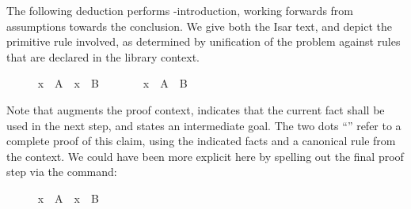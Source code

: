 \begin{isabellebody}
\begin{isamarkuptext}
  \medskip The following deduction performs \isa{{\isachardoublequote}{\isasyminter}{\isachardoublequote}}-introduction,
  working forwards from assumptions towards the conclusion.  We give
  both the Isar text, and depict the primitive rule involved, as
  determined by unification of the problem against rules that are
  declared in the library context.%
\end{isamarkuptext}%
\isamarkuptrue%
%
\medskip\begin{minipage}{0.6\textwidth}
%
\isadelimproof
\ \ \ \ %
\endisadelimproof
%
\isatagproof
{}\isamarkupfalse%
\ {\isachardoublequoteopen}x\ {\isasymin}\ A{\isachardoublequoteclose}\ \ {\isachardoublequoteopen}x\ {\isasymin}\ B{\isachardoublequoteclose}\isanewline
\ \ \ \ \isamarkupfalse%
\ \isamarkupfalse%
\ {\isachardoublequoteopen}x\ {\isasymin}\ A\ {\isasyminter}\ B{\isachardoublequoteclose}\ \isacommand{{\isachardot}{\isachardot}}\isamarkupfalse%
%
\endisatagproof
{\isafoldproof}%
%
\isadelimproof
%
\endisadelimproof
%
\end{minipage}\begin{minipage}{0.4\textwidth}
%
\begin{isamarkuptext}%
%
\end{isamarkuptext}%
\isamarkuptrue%
%
\end{minipage}
%
\begin{isamarkuptext}%
\medskip\noindent Note that \hyperlink{command.assume}{\mbox{}} augments the proof
  context, \hyperlink{command.then}{\mbox{}} indicates that the current fact shall be
  used in the next step, and \hyperlink{command.have}{\mbox{}} states an intermediate
  goal.  The two dots ``\hyperlink{command.ddot}{\mbox{\isa{\isacommand{{\isachardot}{\isachardot}}}}}'' refer to a complete proof of
  this claim, using the indicated facts and a canonical rule from the
  context.  We could have been more explicit here by spelling out the
  final proof step via the \hyperlink{command.by}{\mbox{}} command:%
\end{isamarkuptext}%
\isamarkuptrue%
%
\isadelimproof
\ \ \ \ %
\endisadelimproof
%
\isatagproof
{}\isamarkupfalse%
\ {\isachardoublequoteopen}x\ {\isasymin}\ A{\isachardoublequoteclose}\ \ {\isachardoublequoteopen}x\ {\isasymin}\ B{\isachardoublequoteclose}\isanewline

\end{isabellebody}
